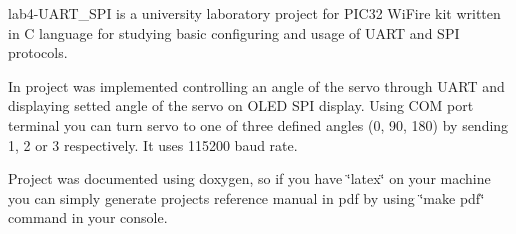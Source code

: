 lab4-\/\+U\+A\+R\+T\+\_\+\+S\+PI is a university laboratory project for P\+I\+C32 Wi\+Fire kit written in C language for studying basic configuring and usage of U\+A\+RT and S\+PI protocols.

In project was implemented controlling an angle of the servo through U\+A\+RT and displaying setted angle of the servo on O\+L\+ED S\+PI display. Using C\+OM port terminal you can turn servo to one of three defined angles (0, 90, 180) by sending \textquotesingle{}1\textquotesingle{}, \textquotesingle{}2\textquotesingle{} or \textquotesingle{}3\textquotesingle{} respectively. It uses 115200 baud rate.

Project was documented using doxygen, so if you have \char`\"{}latex\char`\"{} on your machine you can simply generate project\textquotesingle{}s reference manual in pdf by using \char`\"{}make pdf\char`\"{} command in your console.

 